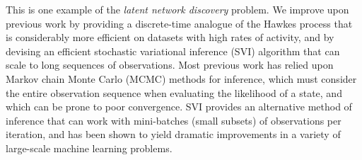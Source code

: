 This is one example of the \emph{latent network discovery} problem.
We improve upon previous work by providing a discrete-time analogue of
the Hawkes process that is considerably more efficient on datasets
with high rates of activity, and by devising an efficient stochastic
variational inference (SVI) algorithm that can scale to long sequences
of observations.  Most previous work has relied upon Markov chain
Monte Carlo (MCMC) methods for inference, which must consider the
entire observation sequence when evaluating the likelihood of a state,
and which can be prone to poor convergence.  SVI provides an
alternative method of inference that can work with mini-batches (small
subsets) of observations per iteration, and has been shown to yield
dramatic improvements in a variety of large-scale machine learning
problems.

